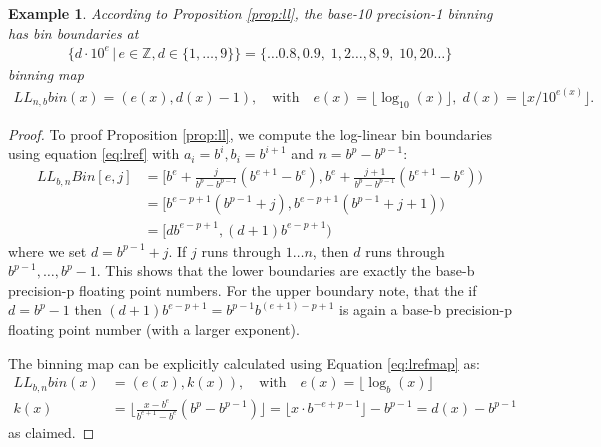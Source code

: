 \documentclass{article}
\theoremstyle{plain}
\newtheorem{example}[definition]{Example}
\theoremstyle{remark}
\newcommand{\IZ}{\mathbb{Z}}
\newcommand{\qtext}[1]{\quad\text{#1}\quad} %
\newcommand{\floor}[1]{\lfloor#1\rfloor}
\begin{document}
\begin{example}
  According to Proposition \ref{prop:ll}, the base-10 precision-1 binning has bin boundaries at
  \begin{align*}
      \{ d \cdot 10^e  \,|\, e \in \IZ, d \in \{ 1, \dots, 9 \} \} = \{ \dots 0.8, 0.9,\; 1, 2 \dots, 8, 9,\; 10, 20 \dots \}
  \end{align*}
  binning map
  \begin{align*}
    LL_{n,b}bin(x) = (e(x), d(x) - 1), \qtext{with} e(x) = \floor{\log_{10}(x)},\; d(x) = \floor{x / 10^{e(x)}}.
  \end{align*}
\end{example}

\begin{proof}
  To proof Proposition \ref{prop:ll}, we compute the log-linear bin boundaries using equation \ref{eq:lref}
  with $a_i = b^i, b_i = b^{i+1}$ and $n = b^p - b^{p-1}$:
  \begin{align*}
    LL_{b,n}Bin[e,j] &= [ b^e + \frac{j}{b^p - b^{p-1}}(b^{e+1} - b^e), b^e + \frac{j + 1}{b^p - b^{p-1}}(b^{e+1} - b^e) ) \\
      &= [ b^{e-p+1}(b^{p-1} + j), b^{e-p+1}(b^{p-1} + j + 1) ) \\
      &= [ d b^{e-p+1}, (d + 1) b^{e-p+1} )
  \end{align*}
  where we set $d = b^{p-1} + j$. If $j$ runs through $1 \dots n$, then $d$ runs through $b^{p-1},\dots, b^p -1$.
  This shows that the lower boundaries are exactly the base-b precision-p floating point numbers.
  For the upper boundary note, that the if $d=b^p-1$ then $(d+1)b^{e-p+1} = b^{p-1} b^{(e+1)-p+1}$ is again
  a base-b precision-p floating point number (with a larger exponent).

  The binning map can be explicitly calculated using Equation \ref{eq:lrefmap} as:
  \begin{align*}
    LL_{b,n}bin(x) &= (e(x), k(x)), \qtext{with} e(x) = \floor{\log_b(x)} \\
    k(x) & = \floor{ \frac{x - b^{e}}{b^{e+1} - b^e} (b^p - b^{p-1}) }
    = \floor{x \cdot b^{-e + p - 1}} - b^{p-1}
    = d(x) - b^{p-1}
  \end{align*}
  as claimed.
\end{proof}
\end{document}
